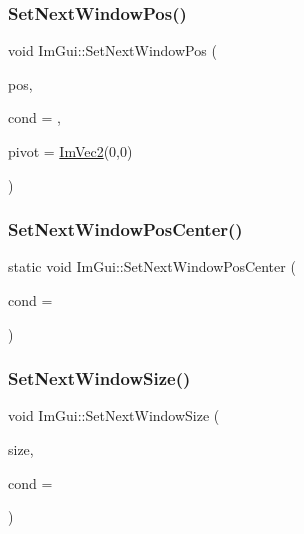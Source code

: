 \hypertarget{namespace_im_gui_afbccd31113430670b5ab2bf0d6f509bf}{}\label{namespace_im_gui_afbccd31113430670b5ab2bf0d6f509bf} 
\subsubsection{\texorpdfstring{Set\+Next\+Window\+Pos()}{SetNextWindowPos()}}
{\footnotesize\ttfamily void Im\+Gui\+::\+Set\+Next\+Window\+Pos (\begin{DoxyParamCaption}\item[{const \hyperlink{struct_im_vec2}{Im\+Vec2} \&}]{pos,  }\item[{Im\+Gui\+Cond}]{cond = {},  }\item[{const \hyperlink{struct_im_vec2}{Im\+Vec2} \&}]{pivot = {\ttfamily \hyperlink{struct_im_vec2}{Im\+Vec2}(0,0)} }\end{DoxyParamCaption})}

\hypertarget{namespace_im_gui_a0d59dc9582f20c086d7882c86a41e8f2}{}\label{namespace_im_gui_a0d59dc9582f20c086d7882c86a41e8f2} 
\subsubsection{\texorpdfstring{Set\+Next\+Window\+Pos\+Center()}{SetNextWindowPosCenter()}}
{\footnotesize\ttfamily static void Im\+Gui\+::\+Set\+Next\+Window\+Pos\+Center (\begin{DoxyParamCaption}\item[{Im\+Gui\+Cond}]{cond = {} }\end{DoxyParamCaption})\hspace{0.3cm}{\ttfamily [static]}}

\hypertarget{namespace_im_gui_ab33717bb71ef5e393ae18656fc6b229d}{}\label{namespace_im_gui_ab33717bb71ef5e393ae18656fc6b229d} 
\subsubsection{\texorpdfstring{Set\+Next\+Window\+Size()}{SetNextWindowSize()}}
{\footnotesize\ttfamily void Im\+Gui\+::\+Set\+Next\+Window\+Size (\begin{DoxyParamCaption}\item[{const \hyperlink{struct_im_vec2}{Im\+Vec2} \&}]{size,  }\item[{Im\+Gui\+Cond}]{cond = {} }\end{DoxyParamCaption})}

